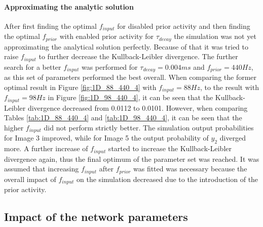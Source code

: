 \paragraph{Approximating the analytic solution}
After first finding the optimal $f_{input}$ for disabled prior activity and then finding the optimal $f_{prior}$ with enabled prior activity for $\tau_{decay}$ the simulation was not yet approximating the analytical solution perfectly. Because of that it was tried to raise $f_{input}$ to further decrease the Kullback-Leibler divergence. The further search for a better $f_{input}$ was performed for $\tau_{decay} = 0.004 ms$ and $f_{prior} = 440 Hz$, as this set of parameters performed the best overall.
When comparing the former optimal result in Figure \ref{fig:1D_88_440_4} with $f_{input} = 88 Hz$, to the result with $f_{input} = 98 Hz$ in Figure \ref{fig:1D_98_440_4}, it can be seen that the Kullback-Leibler divergence decreased from 0.0112 to 0.0101. However, when comparing Tables \ref{tab:1D_88_440_4} and \ref{tab:1D_98_440_4}, it can be seen that the higher $f_{input}$ did not perform strictly better. The simulation output probabilities for Image 3 improved, while for Image 5 the output probability of $y_2$ diverged more. A further increase of $f_{input}$ started to increase the Kullback-Leibler divergence again, thus the final optimum of the parameter set was reached. It was assumed that increasing $f_{input}$ after $f_{prior}$ was fitted was necessary because the overall impact of $f_{input}$ on the simulation decreased due to the introduction of the prior activity.

\subsection{Impact of the network parameters}

